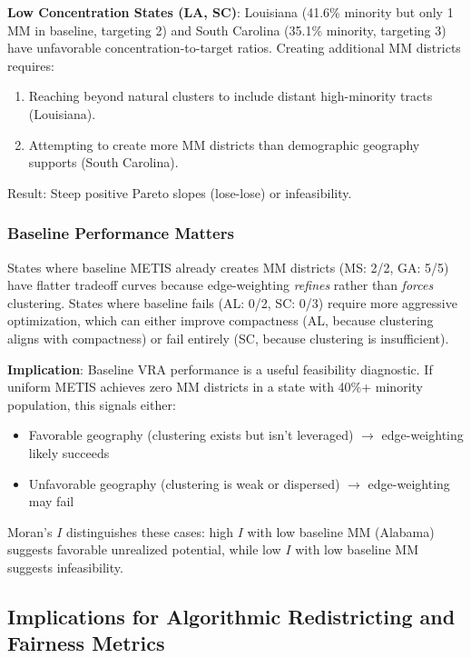 \textbf{Low Concentration States (LA, SC)}: Louisiana (41.6\% minority but only 1 MM in baseline, targeting 2) and South Carolina (35.1\% minority, targeting 3) have unfavorable concentration-to-target ratios. Creating additional MM districts requires:
\begin{enumerate}
    \item Reaching beyond natural clusters to include distant high-minority tracts (Louisiana).
    \item Attempting to create more MM districts than demographic geography supports (South Carolina).
\end{enumerate}

Result: Steep positive Pareto slopes (lose-lose) or infeasibility.

\subsubsection{Baseline Performance Matters}

States where baseline METIS already creates MM districts (MS: 2/2, GA: 5/5) have flatter tradeoff curves because edge-weighting \emph{refines} rather than \emph{forces} clustering. States where baseline fails (AL: 0/2, SC: 0/3) require more aggressive optimization, which can either improve compactness (AL, because clustering aligns with compactness) or fail entirely (SC, because clustering is insufficient).

\textbf{Implication}: Baseline VRA performance is a useful feasibility diagnostic. If uniform METIS achieves zero MM districts in a state with 40\%+ minority population, this signals either:
\begin{itemize}
    \item Favorable geography (clustering exists but isn't leveraged) $\rightarrow$ edge-weighting likely succeeds
    \item Unfavorable geography (clustering is weak or dispersed) $\rightarrow$ edge-weighting may fail
\end{itemize}

Moran's $I$ distinguishes these cases: high $I$ with low baseline MM (Alabama) suggests favorable unrealized potential, while low $I$ with low baseline MM suggests infeasibility.

\subsection{Implications for Algorithmic Redistricting and Fairness Metrics}

